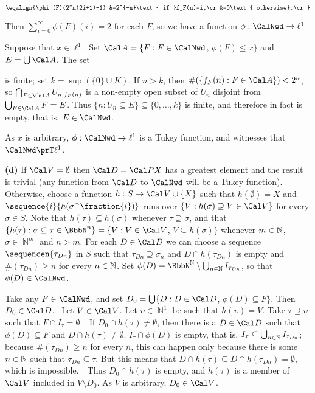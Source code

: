 {$$\eqalign{\phi(F)(2^n(2i+1)-1)
&=2^{-n}\text{ if }f_F(n)=i,\cr
&=0\text{ otherwise}.\cr}$$

\noindent Then
$\sum_{i=0}^{\infty}\phi(F)(i)=2$ for each $F$, so
we have a function $\phi:\CalNwd\to\ell^1$.

Suppose that $x\in\ell^1$.   Set
$\Cal A=\{F:F\in\CalNwd$, $\phi(F)\le x\}$ and $E=\bigcup\Cal A$.
The set


\noindent is finite;   set $k=\sup(\{0\}\cup K)$.   If $n>k$,
then $\#(\{f_F(n):F\in\Cal A\})<2^n$, so
$\bigcap_{F\in\Cal A}U_{n,f_F(n)}$ is a non-empty open subset
of $U_n$ disjoint from $\bigcup_{F\in\Cal A}F=E$.   Thus
$\{n:U_n\subseteq\overline{E}\}\subseteq\{0,\ldots,k\}$ is finite,
and therefore in fact is empty, that is, $E\in\CalNwd$.

As $x$ is arbitrary, $\phi:\CalNwd\to\ell^1$ is a Tukey function, and
witnesses that $\CalNwd\prT\ell^1$.

\medskip

{\bf (d)} If $\Cal V=\emptyset$ then $\Cal D=\Cal PX$ has a greatest
element and the result is trivial (any function from $\Cal D$ to
$\CalNwd$ will be a Tukey function).   Otherwise,
choose a function $h:S\to\Cal V\cup\{X\}$ such that $h(\emptyset)=X$
and $\sequence{i}{h(\sigma^{\smallfrown}\fraction{i})}$ runs over
$\{V:h(\sigma)\supseteq V\in\Cal V\}$ for every $\sigma\in S$.
Note that $h(\tau)\subseteq h(\sigma)$ whenever $\tau\supseteq\sigma$,
and that $\{h(\tau):\sigma\subseteq\tau\in\BbbN^n\}=\{V:V\in\Cal V$,
$V\subseteq h(\sigma)\}$ whenever $m\in\Bbb N$, $\sigma\in\BbbN^m$ and
$n>m$.
For each $D\in\Cal D$ we can choose a sequence $\sequencen{\tau_{Dn}}$
in $S$ such that $\tau_{Dn}\supseteq\sigma_n$ and $D\cap h(\tau_{Dn})$
is empty and $\#(\tau_{Dn})\ge n$ for
every $n\in\Bbb N$.
Set $\phi(D)=\NN\setminus\bigcup_{n\in\Bbb N}I_{\tau_{Dn}}$, so that
$\phi(D)\in\CalNwd$.

Take any $F\in\CalNwd$, and set $D_0=\bigcup\{D:D\in\Cal D$,
$\phi(D)\subseteq F\}$.   Then $D_0\in\Cal D$.   \Prf\ Let $V\in\Cal V$.
Let $\upsilon\in\BbbN^1$ be such that
$h(\upsilon)=V$.   Take $\tau\supseteq\upsilon$ such that $F\cap
I_{\tau}=\emptyset$.   \Quer\ If $D_0\cap h(\tau)\ne\emptyset$, then
there is a $D\in\Cal D$ such that $\phi(D)\subseteq F$
and $D\cap h(\tau)\ne\emptyset$.   $I_{\tau}\cap\phi(D)$ is empty, that
is, $I_{\tau}\subseteq\bigcup_{n\in\Bbb N}I_{\tau_{Dn}}$;  because
$\#(\tau_{Dn})\ge n$ for every $n$, this can happen only because there
is some $n\in\Bbb N$ such that $\tau_{Dn}\subseteq\tau$.   But this
means that $D\cap h(\tau)\subseteq D\cap h(\tau_{Dn})=\emptyset$, which
is impossible.\ \BanG\  Thus $D_0\cap h(\tau)$ is
empty, and $h(\tau)$ is a member of $\Cal V$ included in
$V\setminus D_0$.   As $V$ is arbitrary, $D_0\in\Cal V$.\ \Qed

}

